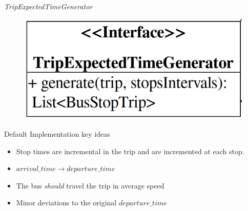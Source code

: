 \documentclass[xcolor=dvipsnames,table]{beamer}
\begin{document}
\begin{frame}{\textit{TripExpectedTimeGenerator}}
        \begin{figure}[H]
                \centering
                \includegraphics[scale=0.25]{images/TripExpectedTimeGenerator.png}
        \end{figure}
        \begin{block}{Default Implementation key ideas}
                \begin{itemize}
                        \item Stop times are incremental in the trip
                                and are incremented at each stop.
                        \item $arrival\_time \rightarrow departure\_time$
                        \item The bus {\em should} travel the trip in average speed
                        \item Minor deviations to the original $departure\_time$
                \end{itemize}
        \end{block}
\end{frame}
\end{document}

